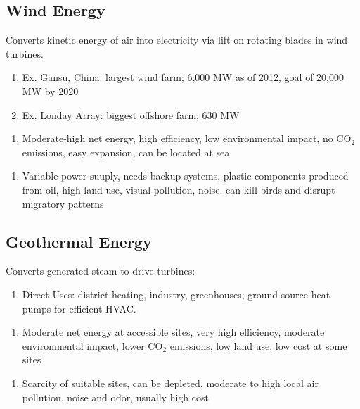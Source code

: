 \documentclass[12pt, a4paper]{article}
\begin{document}
\begin{multicols*}{3}
\subsection{Wind Energy}
Converts kinetic energy of air into electricity via lift on rotating blades in wind turbines.
\begin{enumerate}[\roman*.]
  \item Ex. Gansu, China: largest wind farm; 6,000 MW as of 2012, goal of 20,000 MW by 2020
  \item Ex. Londay Array: biggest offshore farm; 630 MW
\end{enumerate}\vspace{-1pt}
\begin{enumerate}[$+$]
  \item Moderate-high net energy, high efficiency, low environmental impact, no CO$_2$ emissions, easy expansion, can be located at sea 
\end{enumerate}\vspace{-1pt}
\begin{enumerate}[$-$]
  \item Variable power suuply, needs backup systems, plastic components produced from oil, high land use, visual pollution, noise, can kill birds and disrupt migratory patterns 
\end{enumerate}


\subsection{Geothermal Energy}
Converts generated steam to drive turbines:
\begin{enumerate}[\roman*.]
  \item Direct Uses: district heating, industry, greenhouses; ground-source heat pumps for efficient HVAC.
\end{enumerate}\vspace{-1pt}
\begin{enumerate}[$+$]
  \item Moderate net energy at accessible sites, very high efficiency, moderate environmental impact, lower CO$_2$ emissions, low land use, low cost at some sites
\end{enumerate}\vspace{-1pt}
\begin{enumerate}[$-$]
  \item Scarcity of suitable sites, can be depleted, moderate to high local air pollution, noise and odor, usually high cost
\end{enumerate}


\end{multicols*}
\end{document}
